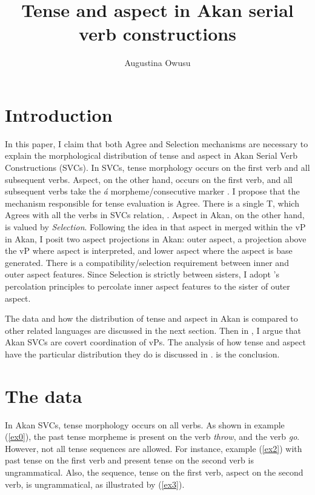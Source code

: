 \documentclass[output=paper,colorlinks,citecolor=brown]{langscibook}
\title{Tense and aspect in Akan serial verb constructions}
\author{Augustina Owusu\affiliation{Rutgers University}}
\begin{document}
\maketitle 

\section{Introduction}\label{sec:owusu:1}

In this paper, I claim that both Agree and Selection mechanisms are necessary to explain the morphological distribution of tense and aspect in Akan Serial Verb Constructions (SVCs). In SVCs, tense morphology occurs on the first verb and all subsequent verbs. Aspect, on the other hand, occurs on the first verb, and all subsequent verbs take the \emph{\'a} morpheme\slash consecutive marker \citep{Dolphyne1996, Osam2003}. I propose that the mechanism responsible for tense evaluation is Agree. There is a single T, which Agrees with all the verbs in SVCs relation, \citep{PesetskyTorrego2007}.  Aspect in Akan, on the other hand, is valued by \emph{Selection}. Following the idea in \citet{Kandybowicz2010, Kandybowicz2015} that aspect in merged within the vP in Akan, I posit two aspect projections in Akan: outer aspect, a projection above the vP where aspect is interpreted, and lower aspect where the aspect is base generated.  There is a compatibility/selection requirement between inner and outer aspect features. Since Selection is strictly between sisters, I adopt \citet{Webelhuth1992}'s percolation principles to percolate inner aspect features to the sister of outer aspect.

The data and how the distribution of tense and aspect in Akan is compared to other related languages are discussed in the next section. Then in , I argue that Akan SVCs are covert coordination of vPs. The analysis of how tense and aspect have the particular distribution they do is discussed in .  is the conclusion.  

\section{The data}\label{sec:owusu:2}
In Akan SVCs, tense morphology occurs on all verbs. As shown in example (\ref{ex0}), the past tense morpheme is present on the verb \emph{throw}, and the verb \emph{go}. However, not all tense sequences are allowed. For instance, example (\ref{ex2}) with past tense on the first verb and present tense on the second verb is ungrammatical. Also, the sequence, tense on the first verb, aspect on the second verb, is ungrammatical, as illustrated by (\ref{ex3}). 
 
\end{document}
